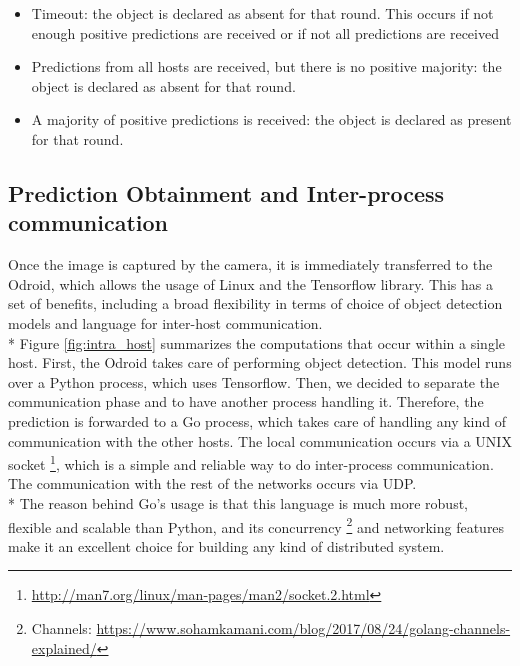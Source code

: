 \documentclass[10pt,conference,compsocconf]{IEEEtran}
\begin{document}
\begin{itemize}
\item Timeout: the object is declared as absent for that round. This occurs if not enough positive predictions are received or if not all predictions are received
\item Predictions from all hosts are received, but there is no positive majority: the object is declared as absent for that round.
\item A majority of positive predictions is received: the object is declared as present for that round.
\end{itemize}
\subsection{Prediction Obtainment and Inter-process communication}Once the image is captured by the camera, it is immediately transferred to the Odroid, which allows the usage of Linux and the Tensorflow library. This has a set of benefits, including a broad flexibility in terms of choice of object detection models and language for inter-host communication.\\*
Figure \ref{fig:intra_host} summarizes the computations that occur within a single host.
First, the Odroid takes care of performing object detection. This model runs over a Python process, which uses Tensorflow. Then, we decided to separate the communication phase and to have another process handling it.
Therefore, the prediction is forwarded to a Go process, which takes care of handling any kind of communication with the other hosts. The local communication occurs via a UNIX socket \footnote{\url{http://man7.org/linux/man-pages/man2/socket.2.html}}, which is a simple and reliable way to do inter-process communication. The communication with the rest of the networks occurs via UDP.\\*
The reason behind Go's usage is that this language is much more robust, flexible and scalable than Python, and its concurrency \footnote{Channels: \url{https://www.sohamkamani.com/blog/2017/08/24/golang-channels-explained/}} and networking features make it an excellent choice for building any kind of distributed system.
\end{document}
